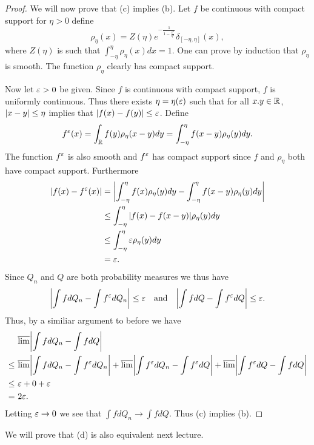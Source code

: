 \begin{proof}
    We will now prove that (c) implies (b). Let $f$ be continuous with compact support for $\eta > 0$ define
    \[\rho_\eta(x) = Z(\eta)e^{-\frac{1}{1-\frac{x^2}{\eta^2}}}\delta_{[-\eta,\eta]}(x), \]
    where $Z(\eta)$ is such that $\int_{-\eta}^\eta \rho_\eta(x)dx=1$. One can prove by induction that $\rho_\eta$ is smooth. The function $\rho_\eta$ clearly has compact support. 
    
    Now let $\varepsilon > 0$ be given. Since $f$ is continuous with compact support, $f$ is uniformly continuous. Thus there exists $\eta = \eta(\varepsilon)$ such that for all $x. y \in {\mathbb R}$, ${\left\lvert x-y\right\rvert} \le \eta$ implies that ${\left\lvert f(x)-f(y)\right\rvert}\le \varepsilon$. Define
    \[f^\varepsilon(x) = \int_{\mathbb R} f(y)\rho_\eta(x-y)dy = \int_{-\eta}^\eta f(x-y)\rho_\eta(y)dy.\] 
    The function $f^\varepsilon$ is also smooth and $f^\varepsilon$ has compact support since $f$ and $\rho_\eta$ both have compact support. Furthermore 
    \begin{align*}
        {\left\lvert f(x)-f^\varepsilon(x)\right\rvert} & ={\left\lvert\int_{-\eta}^\eta  f(x)\rho_\eta(y)dy-\int_{-\eta}^\eta f(x-y)\rho_\eta(y)dy\right\rvert}\\
        &\le \int_{-\eta}^\eta {\left\lvert f(x)-f(x-y)\right\rvert}\rho_\eta(y)dy\\
        &\le  \int_{-\eta}^\eta\varepsilon \rho_\eta(y)dy\\
        &= \varepsilon.
    \end{align*}
    Since $Q_n$ and $Q$ are both probability measures we thus have 
    \[{\left\lvert\int f dQ_n - \int f^\varepsilon dQ_n \right\rvert} \le \varepsilon~~~\text{and}~~~{\left\lvert\int f dQ - \int f^\varepsilon dQ\right\rvert} \le \varepsilon.\]
    Thus, by a similiar argument to before we have 
    \begin{align*}
        &~\overline{\lim} {\left\lvert\int f dQ_n - \int f dQ\right\rvert}\\
        \le & ~\overline{\lim} {\left\lvert\int f dQ_n - \int f^\varepsilon dQ_n\right\rvert}+\overline{\lim} {\left\lvert\int f^\varepsilon dQ_n - \int f^\varepsilon dQ\right\rvert}+\overline{\lim} {\left\lvert\int f^\varepsilon dQ - \int f dQ\right\rvert}\\
        \le & ~\varepsilon + 0 + \varepsilon \\
        =& ~2\varepsilon.
    \end{align*}
    Letting $\varepsilon \to 0$ we see that $\int fdQ_n \to \int fdQ$. Thus (c) implies (b).
\end{proof}


We will prove that (d) is also equivalent next lecture.


